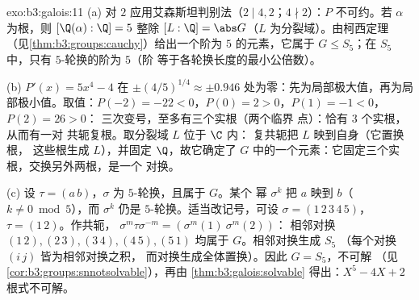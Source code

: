 \begin{solution}{exo:b3:galois:11}
(a) 对 $2$ 应用艾森斯坦判别法（$2 \mid 4, 2$；$4 \nmid 2$）：$P$
不可约。若 $\alpha$ 为根，则 $[\Q(\alpha):\Q] = 5$
整除 $[L:\Q] = \abs G$（$L$ 为分裂域）。由柯西定理
（见\cref{thm:b3:groups:cauchy}）给出一个阶为 $5$ 的元素，它属于
$G \leq S_5$；在 $S_5$ 中，只有 $5$-轮换的阶为 $5$（阶
等于各轮换长度的最小公倍数）。

(b) $P'(x) = 5x^4 - 4$ 在 $\pm(4/5)^{1/4} \approx \pm
0.946$ 处为零：先为局部极大值，再为局部极小值。取值：$P(-2)
= -22 < 0$，$P(0) = 2 > 0$，$P(1) = -1 < 0$，$P(2) = 26 > 0$：
三次变号，至多有三个实根（两个临界
点）：恰有 $3$ 个实根，从而有一对
共轭复根。取分裂域 $L$ 位于 $\C$ 内：
复共轭把 $L$ 映到自身（它置换根，
这些根生成 $L$），并固定 $\Q$，故它确定了
$G$ 中的一个元素：它固定三个实根，交换另外两根，是一个
对换。

(c) 设 $\tau = (a\,b)$，$\sigma$ 为 $5$-轮换，且属于 $G$。某个
幂 $\sigma^k$ 把 $a$ 映到 $b$（$k \ne 0 \bmod 5$），而
$\sigma^k$ 仍是 $5$-轮换。适当改记号，可设 $\sigma =
(1\,2\,3\,4\,5)$，$\tau = (1\,2)$。作共轭，
$\sigma^m\tau\sigma^{-m} = (\sigma^m(1)\ \sigma^m(2))$：
相邻对换 $(1\,2), (2\,3), (3\,4), (4\,5),
(5\,1)$ 均属于 $G$。相邻对换生成 $S_5$
（每个对换 $(i\,j)$ 皆为相邻对换之积，
而对换生成全体置换）。因此 $G = S_5$，不可解
（见\cref{cor:b3:groups:snnotsolvable}），再由
\cref{thm:b3:galois:solvable} 得出：$X^5 - 4X + 2$
根式不可解。
\end{solution}

